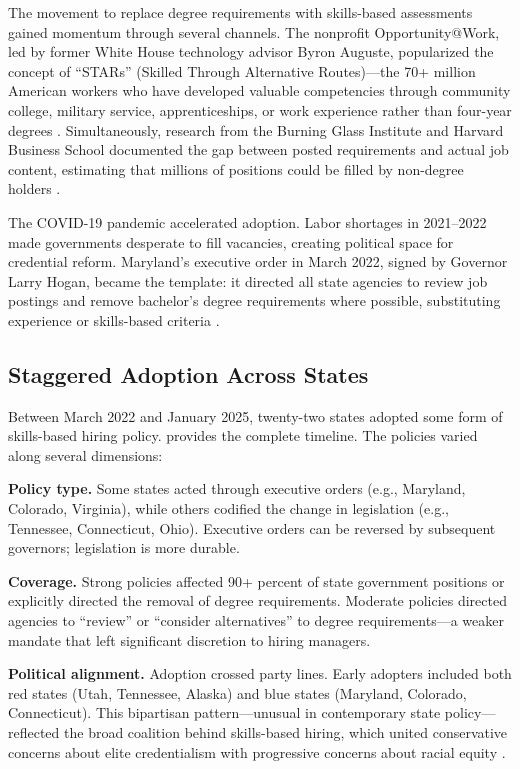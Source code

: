 \documentclass[12pt]{article}
\begin{document}
The movement to replace degree requirements with skills-based assessments gained momentum through several channels. The nonprofit Opportunity@Work, led by former White House technology advisor Byron Auguste, popularized the concept of ``STARs'' (Skilled Through Alternative Routes)---the 70+ million American workers who have developed valuable competencies through community college, military service, apprenticeships, or work experience rather than four-year degrees \citep{OpportunityAtWork2022}. Simultaneously, research from the Burning Glass Institute and Harvard Business School documented the gap between posted requirements and actual job content, estimating that millions of positions could be filled by non-degree holders \citep{FullerRaman2017, BurningGlass2022}.

The COVID-19 pandemic accelerated adoption. Labor shortages in 2021--2022 made governments desperate to fill vacancies, creating political space for credential reform. Maryland's executive order in March 2022, signed by Governor Larry Hogan, became the template: it directed all state agencies to review job postings and remove bachelor's degree requirements where possible, substituting experience or skills-based criteria \citep{MarylandEO2022}.

\subsection{Staggered Adoption Across States}

Between March 2022 and January 2025, twenty-two states adopted some form of skills-based hiring policy.  provides the complete timeline. The policies varied along several dimensions:

\textbf{Policy type.} Some states acted through executive orders (e.g., Maryland, Colorado, Virginia), while others codified the change in legislation (e.g., Tennessee, Connecticut, Ohio). Executive orders can be reversed by subsequent governors; legislation is more durable.

\textbf{Coverage.} Strong policies affected 90+ percent of state government positions or explicitly directed the removal of degree requirements. Moderate policies directed agencies to ``review'' or ``consider alternatives'' to degree requirements---a weaker mandate that left significant discretion to hiring managers.

\textbf{Political alignment.} Adoption crossed party lines. Early adopters included both red states (Utah, Tennessee, Alaska) and blue states (Maryland, Colorado, Connecticut). This bipartisan pattern---unusual in contemporary state policy---reflected the broad coalition behind skills-based hiring, which united conservative concerns about elite credentialism with progressive concerns about racial equity \citep{Brookings2023}.
\end{document}
